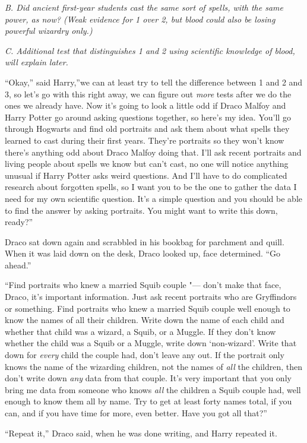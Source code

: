 \emph{B. Did ancient first-year students cast the same sort of spells,
with the same power, as now? (Weak evidence for 1 over 2, but blood
could also be losing powerful wizardry only.)}

\emph{C. Additional test that distinguishes 1 and 2 using scientific
knowledge of blood, will explain later.}

``Okay,'' said Harry,''we can at least try to tell the difference
between 1 and 2 and 3, so let's go with this right away, we can figure
out \emph{more} tests after we do the ones we already have. Now it's
going to look a little odd if Draco Malfoy and Harry Potter go around
asking questions together, so here's my idea. You'll go through Hogwarts
and find old portraits and ask them about what spells they learned to
cast during their first years. They're portraits so they won't know
there's anything odd about Draco Malfoy doing that. I'll ask recent
portraits and living people about spells we know but can't cast, no one
will notice anything unusual if Harry Potter asks weird questions. And
I'll have to do complicated research about forgotten spells, so I want
you to be the one to gather the data I need for my own scientific
question. It's a simple question and you should be able to find the
answer by asking portraits. You might want to write this down, ready?''

Draco sat down again and scrabbled in his bookbag for parchment and
quill. When it was laid down on the desk, Draco looked up, face
determined. ``Go ahead.''

``Find portraits who knew a married Squib couple "--- don't make that face,
Draco, it's important information. Just ask recent portraits who are
Gryffindors or something. Find portraits who knew a married Squib couple
well enough to know the names of all their children. Write down the name
of each child and whether that child was a wizard, a Squib, or a Muggle.
If they don't know whether the child was a Squib or a Muggle, write down
`non-wizard'. Write that down for \emph{every} child the couple had,
don't leave any out. If the portrait only knows the name of the
wizarding children, not the names of \emph{all} the children, then don't
write down \emph{any} data from that couple. It's very important that
you only bring me data from someone who knows \emph{all} the children a
Squib couple had, well enough to know them all by name. Try to get at
least forty names total, if you can, and if you have time for more, even
better. Have you got all that?''

``Repeat it,'' Draco said, when he was done writing, and Harry repeated
it.

